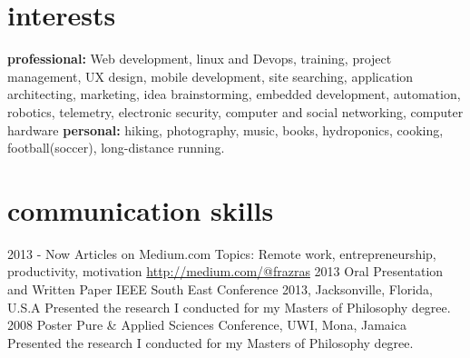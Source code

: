 \documentclass[]{friggeri-cv} %
\begin{document}

\section{interests}

\textbf{professional:} Web development, linux and Devops, training, project management, UX design, mobile development, site searching, application architecting, marketing, idea brainstorming, embedded development, automation, robotics, telemetry, electronic security, computer and social networking, computer hardware
\textbf{personal:} hiking, photography, music, books, hydroponics, cooking, football(soccer), long-distance running.




\newpage
\section{communication skills}

\begin{entrylist}

\entry
{2013 - Now}
{Articles on Medium.com}
{Topics: Remote work, entrepreneurship, productivity, motivation}
{\href{http://medium.com/@frazras}{http://medium.com/@frazras}}
\entry
{2013}
{Oral Presentation and Written Paper}
{IEEE South East Conference 2013, Jacksonville, Florida, U.S.A}
{Presented the research I conducted for my Masters of Philosophy degree.}
\entry
{2008}
{Poster}
{Pure \& Applied Sciences Conference, UWI, Mona, Jamaica}
{Presented the research I conducted for my Masters of Philosophy degree.}
\end{entrylist}
\end{document}
